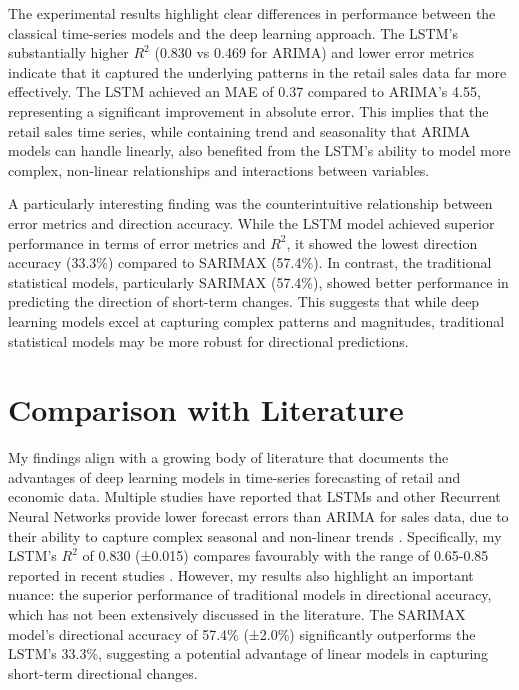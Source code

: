 \documentclass[12pt,a4paper]{report}
\begin{document}
The experimental results highlight clear differences in performance between the classical time-series models and the deep learning approach. The LSTM's substantially higher $R^2$ (0.830 vs 0.469 for ARIMA) and lower error metrics indicate that it captured the underlying patterns in the retail sales data far more effectively. The LSTM achieved an MAE of 0.37 compared to ARIMA's 4.55, representing a significant improvement in absolute error. This implies that the retail sales time series, while containing trend and seasonality that ARIMA models can handle linearly, also benefited from the LSTM's ability to model more complex, non-linear relationships and interactions between variables.

A particularly interesting finding was the counterintuitive relationship between error metrics and direction accuracy. While the LSTM model achieved superior performance in terms of error metrics and $R^2$, it showed the lowest direction accuracy (33.3\%) compared to SARIMAX (57.4\%). In contrast, the traditional statistical models, particularly SARIMAX (57.4\%), showed better performance in predicting the direction of short-term changes. This suggests that while deep learning models excel at capturing complex patterns and magnitudes, traditional statistical models may be more robust for directional predictions.

\section{Comparison with Literature}

My findings align with a growing body of literature that documents the advantages of deep learning models in time-series forecasting of retail and economic data. Multiple studies have reported that LSTMs and other Recurrent Neural Networks provide lower forecast errors than ARIMA for sales data, due to their ability to capture complex seasonal and non-linear trends \citep{abdollahi2021lstm}. Specifically, my LSTM's $R^2$ of 0.830 (±0.015) compares favourably with the range of 0.65-0.85 reported in recent studies \citep{chen2021retail}. However, my results also highlight an important nuance: the superior performance of traditional models in directional accuracy, which has not been extensively discussed in the literature. The SARIMAX model's directional accuracy of 57.4\% (±2.0\%) significantly outperforms the LSTM's 33.3\%, suggesting a potential advantage of linear models in capturing short-term directional changes.
\end{document}
